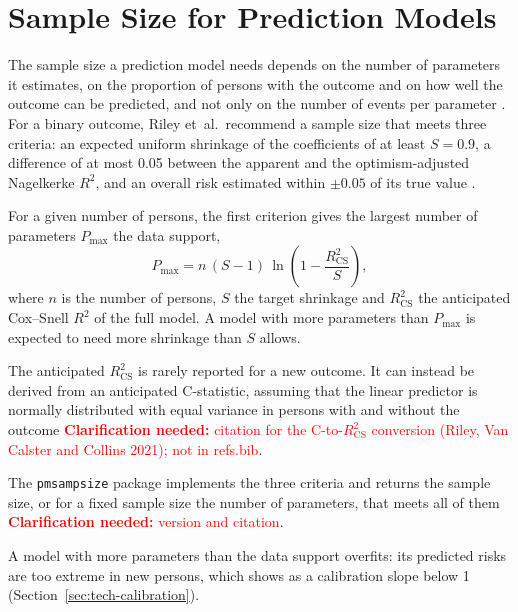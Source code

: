 \providecommand{\clarify}[1]{\textcolor{red}{\textbf{Clarification needed:} #1}}
\section{Sample Size for Prediction Models}
\label{sec:tech-sample-size}

The sample size a prediction model needs depends on the number of parameters it estimates, on the proportion of persons with the outcome and on how well the outcome can be predicted, and not only on the number of events per parameter \cite{riley2020samplesize}.
For a binary outcome, Riley et~al.\ recommend a sample size that meets three criteria: an expected uniform shrinkage of the coefficients of at least $S = 0.9$, a difference of at most 0.05 between the apparent and the optimism-adjusted Nagelkerke $R^2$, and an overall risk estimated within $\pm 0.05$ of its true value \cite{riley2020samplesize}.

For a given number of persons, the first criterion gives the largest number of parameters $P_{\max}$ the data support,
\begin{equation}
  P_{\max} = n\,(S-1)\,\ln\!\left(1 - \frac{R^2_{\mathrm{CS}}}{S}\right),
  \label{eq:tech-pmax}
\end{equation}
where $n$ is the number of persons, $S$ the target shrinkage and $R^2_{\mathrm{CS}}$ the anticipated Cox--Snell $R^2$ of the full model.
A model with more parameters than $P_{\max}$ is expected to need more shrinkage than $S$ allows.

The anticipated $R^2_{\mathrm{CS}}$ is rarely reported for a new outcome.
It can instead be derived from an anticipated C-statistic, assuming that the linear predictor is normally distributed with equal variance in persons with and without the outcome \clarify{citation for the C-to-$R^2_{\mathrm{CS}}$ conversion (Riley, Van Calster and Collins 2021); not in refs.bib}.

The \texttt{pmsampsize} package implements the three criteria and returns the sample size, or for a fixed sample size the number of parameters, that meets all of them \clarify{version and citation}.

A model with more parameters than the data support overfits: its predicted risks are too extreme in new persons, which shows as a calibration slope below 1 (Section~\ref{sec:tech-calibration}).

